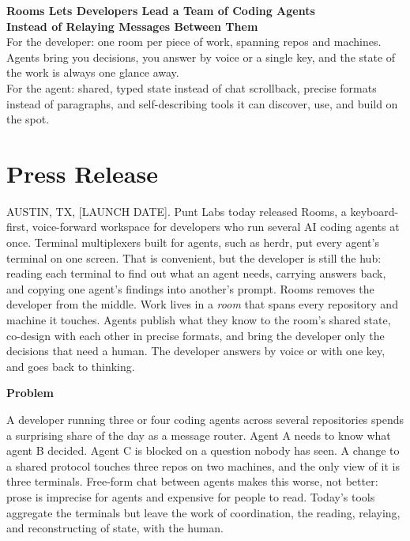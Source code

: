 \documentclass[11pt,letterpaper]{article}
\newcommand{\product}{Rooms}
\newcommand{\prsection}[1]{%
  \vspace{1em}%
  {\large\bfseries\color{SectionBlue}#1}%
  \vspace{0.3em}\par%
}
\begin{document}
\begin{center}
  {\LARGE\bfseries\color{SectionBlue}
    \product{} Lets Developers Lead a Team of Coding Agents\\
    Instead of Relaying Messages Between Them} \\[0.8em]
  {\large\color{AccentGray}
    For the developer: one room per piece of work, spanning repos and machines.
    Agents bring you decisions, you answer by voice or a single key, and the
    state of the work is always one glance away.} \\[0.3em]
  {\large\color{AccentGray}
    For the agent: shared, typed state instead of chat scrollback, precise
    formats instead of paragraphs, and self-describing tools it can discover,
    use, and build on the spot.}
\end{center}

\vspace{0.5em}


\section*{Press Release}

AUSTIN, TX, [LAUNCH DATE]. Punt Labs today released \product{}, a
keyboard-first, voice-forward workspace for developers who run several AI
coding agents at once. Terminal multiplexers built for agents, such as
herdr\cite{herdr}, put every agent's terminal on one screen. That is
convenient, but the developer is still the hub: reading each terminal to find
out what an agent needs, carrying answers back, and copying one agent's
findings into another's prompt. \product{} removes the developer from the
middle. Work lives in a \emph{room} that spans every repository and machine it
touches. Agents publish what they know to the room's shared state, co-design
with each other in precise formats, and bring the developer only the decisions
that need a human. The developer answers by voice or with one key, and goes
back to thinking.

\prsection{Problem}

A developer running three or four coding agents across several repositories
spends a surprising share of the day as a message router. Agent A needs to
know what agent B decided. Agent C is blocked on a question nobody has seen.
A change to a shared protocol touches three repos on two machines, and the
only view of it is three terminals. Free-form chat between agents makes this
worse, not better: prose is imprecise for agents and expensive for people to
read. Today's tools aggregate the terminals but leave the work of
coordination, the reading, relaying, and reconstructing of state, with the
human.
\end{document}
